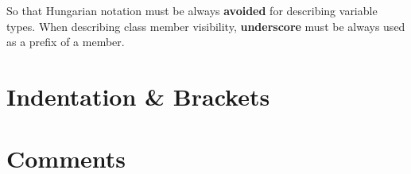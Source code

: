 \documentclass{article}
\begin{document}
So that Hungarian notation must be always \textbf{avoided} for describing variable types. When describing class
member visibility, \textbf{underscore} must be always used as a prefix of a member.


%


\newpage

% 

\section{Indentation \& Brackets}




%


\newpage

% 

\section{Comments}




%
\end{document}
